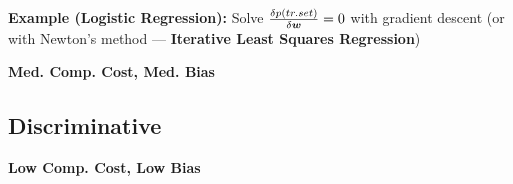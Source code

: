 \textbf{Example (Logistic Regression):} Solve $\frac{\delta p(tr. set)}{\delta{\bm{w}}}=0$ with gradient descent (or with Newton's method --- \textbf{Iterative Least Squares Regression})

\textbf{{\color{orange} Med. Comp. Cost}, {\color{orange}Med. Bias}}
\subsection*{Discriminative}
\textbf{{\color{ForestGreen} Low Comp. Cost}, {\color{ForestGreen}Low Bias}}






